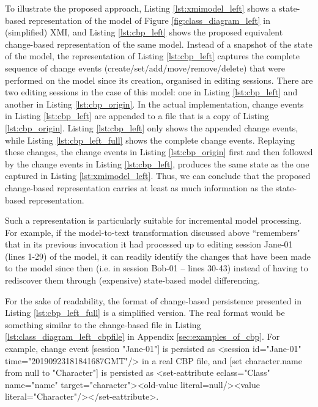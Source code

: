 To illustrate the proposed approach, Listing \ref{lst:xmimodel_left} shows a state-based representation of the model of Figure \ref{fig:class_diagram_left} in (simplified) XMI, and Listing \ref{lst:cbp_left} shows the proposed equivalent change-based representation of the same model. Instead of a snapshot of the state of the model, the representation of Listing \ref{lst:cbp_left} captures the complete sequence of change events (create/set/add/move/remove/delete) that were performed on the model since its creation, organised in editing sessions. There are two editing sessions in the case of this model: one in Listing \ref{lst:cbp_left} and another in Listing \ref{lst:cbp_origin}. In the actual implementation, change events in Listing \ref{lst:cbp_left} are appended to a file that is a copy of Listing \ref{lst:cbp_origin}. Listing \ref{lst:cbp_left} only shows the appended change events, while Listing \ref{lst:cbp_left_full} shows the complete change events. Replaying these changes, the change events in Listing \ref{lst:cbp_origin} first and then followed by the change events in Listing \ref{lst:cbp_left}, produces the same state as the one captured in Listing \ref{lst:xmimodel_left}. Thus, we can conclude that the proposed change-based representation carries at least as much information as the state-based representation. 

Such a representation is particularly suitable for incremental model processing. For example, if the model-to-text transformation discussed above ``remembers" that in its previous invocation it had processed up to editing session \textsf{Jane-01} (lines 1-29) of the model, it can readily identify the changes that have been made to the model since then (i.e. in session \textsf{Bob-01} -- lines 30-43) instead of having to rediscover them through (expensive) state-based model differencing.

For the sake of readability, the format of change-based persistence presented in Listing \ref{lst:cbp_left_full} is a simplified version. The real format would be something similar to the change-based file in Listing \ref{lst:class_diagram_left_cbpfile} in Appendix \ref{sec:examples_of_cbp}. For example, change event [\textsf{session "Jane-01"}] is persisted as 
\textsf{<session id="Jane-01" time="20190923181841687GMT"/>} in a real CBP file, and [\textsf{set character.name from null to "Character"}] is persisted as \textsf{<set-eattribute eclass="Class" name="name" target="character"><old-value literal=null/><value literal="Character"/></set-eattribute>}.

